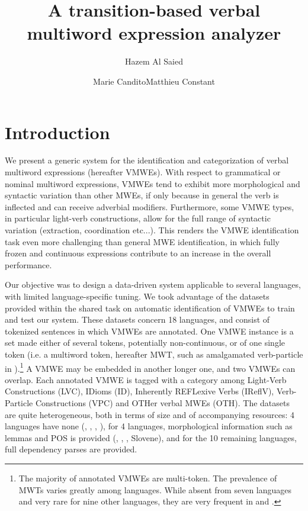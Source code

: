 \documentclass[output=paper,modfonts]{langscibook}
\title{A transition-based verbal multiword expression analyzer}
\author{Hazem Al Saied\affiliation{ATILF UMR 7118, Universit\'e de Lorraine/CNRS}\and  Marie Candito\affiliation{LLF UMR 7110, Universit\'e Paris Diderot/CNRS}\lastand   Matthieu Constant\affiliation{ATILF UMR 7118, Universit\'e de Lorraine/CNRS}}
\begin{document}
\maketitle
\label{ALSAIED-CHAPTER}
\section{Introduction}
We present a generic system for the identification and categorization of verbal multiword expressions (hereafter VMWEs).
With respect to grammatical or nominal multiword expressions, VMWEs tend to exhibit more morphological and syntactic variation than other MWEs, if only because in general the verb is inflected and can receive adverbial modifiers. Furthermore, some VMWE types, in particular light-verb constructions, allow for the full range of syntactic variation (extraction, coordination etc...). This renders the VMWE identification task even more challenging than general MWE identification, in which fully frozen and continuous expressions contribute to an increase in the overall performance.

Our objective was to design a data-driven system applicable to several languages, with limited language-specific tuning. We took advantage of the datasets provided within the shared task on automatic identification of VMWEs \citep{MWEWorkshop} to train and test our system.
These datasets concern 18 languages, and consist of tokenized sentences in which VMWEs are annotated. One VMWE instance is a set made either of several tokens, potentially non-continuous, or of one single token  (i.e. a multiword token, hereafter MWT, such as amalgamated verb-particle in ).\footnote{The majority of annotated VMWEs are multi-token. The prevalence of MWTs varies greatly among languages. While absent from seven languages and very rare for nine other languages, they are very frequent in  and .} A VMWE may be embedded in another longer one, and two VMWEs can overlap. Each annotated VMWE is tagged with a category among Light-Verb Constructions (LVC), IDioms (ID), Inherently REFLexive Verbs (IReflV), Verb-Particle Constructions (VPC) and OTHer verbal MWEs (OTH). The datasets are quite heterogeneous, both in terms of size and of accompanying resources: 4 languages have none (, , , ), for 4 languages, morphological information such as lemmas and POS is provided (, , , Slovene), and for the 10 remaining languages, full dependency parses are provided.
\end{document}
